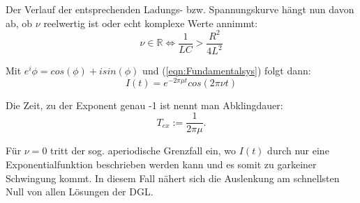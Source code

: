 \documentclass{scrartcl}
\begin{document}
        Der Verlauf der entsprechenden Ladungs- bzw. Spannungskurve hängt nun davon ab,
        ob $\nu$ reelwertig ist oder echt komplexe Werte annimmt:
        \begin{equation*}
            \nu \in \mathbb{R} \iff \frac{1}{LC} > \frac{R^2}{4L^2}
        \end{equation*}

        Mit $e^i\phi= cos(\phi)+isin(\phi)$ und (\ref{eqn:Fundamentalsys}) folgt dann:
        \begin{equation}
            I(t) = e^{-2\pi\mu t}cos(2\pi\nu t)
        \end{equation}

        Die Zeit, zu der Exponent genau -1 ist nennt man Abklingdauer:
        \begin{equation}
            \label{eqn:Abkling}
            T_{ex} := \frac{1}{2\pi\mu}.
        \end{equation}

        Für $\nu = 0$ tritt der sog. aperiodische Grenzfall ein,
        wo $I(t)$ durch nur eine Exponentialfunktion beschrieben werden kann und es somit zu garkeiner Schwingung kommt.
        In diesem Fall nähert sich die Auslenkung am schnellsten Null von allen Lösungen der DGL.
\end{document}
